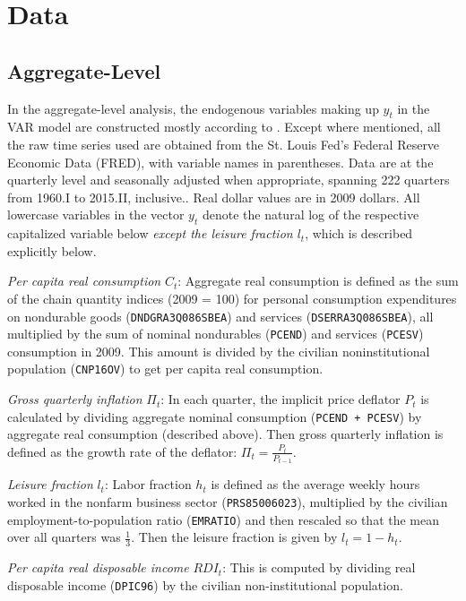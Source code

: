 \section{Data}

\subsection{Aggregate-Level}
In the aggregate-level analysis, the endogenous variables making up $y_t$ in the VAR model are constructed mostly according to \cite{collard11}. Except where mentioned, all the raw time series used are obtained from the St. Louis Fed's Federal Reserve Economic Data (FRED), with variable names in parentheses. Data are at the quarterly level and seasonally adjusted when appropriate, spanning 222 quarters from 1960.I to 2015.II, inclusive.. Real dollar values are in 2009 dollars. All lowercase variables in the vector $y_t$ denote the natural log of the respective capitalized variable below \textit{except the leisure fraction $l_t$}, which is described explicitly below.

\textit{Per capita real consumption} $C_t$: Aggregate real consumption is defined as the sum of the chain quantity indices (2009 = 100) for personal consumption expenditures on nondurable goods (\texttt{DNDGRA3Q086SBEA}) and services (\texttt{DSERRA3Q086SBEA}), all multiplied by the sum of nominal nondurables (\texttt{PCEND}) and services (\texttt{PCESV}) consumption in 2009. This amount is divided by the civilian noninstitutional population (\texttt{CNP16OV}) to get per capita real consumption.

\textit{Gross quarterly inflation} $\Pi_t$: In each quarter, the implicit price deflator $P_t$ is calculated by dividing aggregate nominal consumption (\texttt{PCEND + PCESV}) by aggregate real consumption (described above). Then gross quarterly inflation is defined as the growth rate of the deflator: $\Pi_t = \frac{P_t}{P_{t-1}}$.

\textit{Leisure fraction} $l_t$: Labor fraction $h_t$ is defined as the average weekly hours worked in the nonfarm business sector (\texttt{PRS85006023}), multiplied by the civilian employment-to-population ratio (\texttt{EMRATIO}) and then rescaled so that the mean over all quarters was $\frac{1}{3}$. Then the leisure fraction is given by $l_t = 1 - h_t$.

\textit{Per capita real disposable income} $RDI_t$: This is computed by dividing real disposable income (\texttt{DPIC96}) by the civilian non-institutional population.

